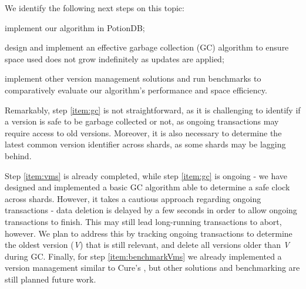 We identify the following next steps on this topic:
\begin{enumerate*}[label=(\roman*)]
	\item \label{item:vms} implement our algorithm in PotionDB;
	\item \label{item:gc} design and implement an effective garbage collection (GC) algorithm to ensure space used does not grow indefinitely as updates are applied;
	\item \label{item:benchmarkVms} implement other version management solutions and run benchmarks to comparatively evaluate our algorithm's performance and space efficiency.
\end{enumerate*}
Remarkably, step \ref{item:gc} is not straightforward, as it is challenging to identify if a version is safe to be garbage collected or not, as ongoing transactions may require access to old versions. %
Moreover, it is also necessary to determine the latest common version identifier across shards, as some shards may be lagging behind.

Step \ref{item:vms} is already completed, while step \ref{item:gc} is ongoing - we have designed and implemented a basic GC algorithm able to determine a safe clock across shards.
However, it takes a cautious approach regarding ongoing transactions - data deletion is delayed by a few seconds in order to allow ongoing transactions to finish.
This may still lead long-running transactions to abort, however.
We plan to address this by tracking ongoing transactions to determine the oldest version (\emph{V}) that is still relevant, and delete all versions older than \emph{V} during GC. 
Finally, for step \ref{item:benchmarkVms} we already implemented a version management similar to Cure's \cite{cure}, but other solutions and benchmarking are still planned future work.



